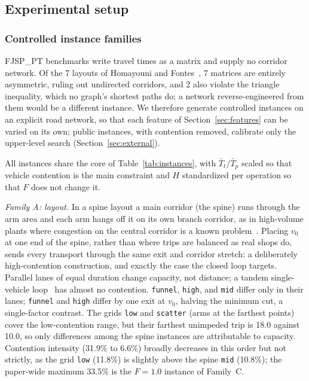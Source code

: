 \documentclass[manuscript,screen,review]{acmart}
\newcommand{\ContentionLo}{6.6\%}
\newcommand{\ContentionHi}{33.5\%}
\newcommand{\ContentionAHi}{31.9\%}
\newcommand{\ContentionALow}{11.8\%}
\newcommand{\ContentionAMid}{10.8\%}
\newcommand{\LegDumbbell}{10.0}          %
\newcommand{\LegGrid}{18.0}              %
\newcommand{\PubNLayout}{7}
\newcommand{\PubNLayoutAsym}{7}           %
\newcommand{\PubNLayoutBad}{2}            %
\begin{document}
\subsection{Experimental setup}
\label{sec:instances}

\subsubsection{Controlled instance families}
FJSP\_PT benchmarks write travel times as a matrix and supply no corridor network.
Of the \PubNLayout{} layouts of Homayouni and Fontes~\cite{homayouni2021production}, \PubNLayoutAsym{} matrices are entirely asymmetric, ruling out undirected corridors, and \PubNLayoutBad{} also violate the triangle inequality, which no graph's shortest paths do; a network reverse-engineered from them would be a different instance.
We therefore generate controlled instances on an explicit road network, so that each feature of Section~\ref{sec:features} can be varied on its own; public instances, with contention removed, calibrate only the upper-level search (Section~\ref{sec:external}).

All instances share the core of Table~\ref{tab:instances}, with $\bar{T}_t/\bar{T}_p$ scaled so that vehicle contention is the main constraint and $H$ standardized per operation so that $F$ does not change it.

\emph{Family A: layout.}
In a spine layout a main corridor (the spine) runs through the arm area and each arm hangs off it on its own branch corridor, as in high-volume plants where congestion on the central corridor is a known problem~\cite{suh2022spine}.
Placing $v_0$ at one end of the spine, rather than where trips are balanced as real shops do, sends every transport through the same exit and corridor stretch: a deliberately high-contention construction, and exactly the case the closed loop targets.
Parallel lanes of equal duration change capacity, not distance; a tandem single-vehicle loop~\cite{rahimikelarijani2020tandem} has almost no contention.
\texttt{funnel}, \texttt{high}, and \texttt{mid} differ only in their lanes; \texttt{funnel} and \texttt{high} differ by one exit at $v_0$, halving the minimum cut, a single-factor contrast.
The grids \texttt{low} and \texttt{scatter} (arms at the farthest points) cover the low-contention range, but their farthest unimpeded trip is \LegGrid{} against \LegDumbbell{}, so only differences among the spine instances are attributable to capacity.
Contention intensity (\ContentionAHi{} to \ContentionLo{}) broadly decreases in this order but not strictly, as the grid \texttt{low} (\ContentionALow{}) is slightly above the spine \texttt{mid} (\ContentionAMid{}); the paper-wide maximum \ContentionHi{} is the $F=1.0$ instance of Family~C.
\end{document}
